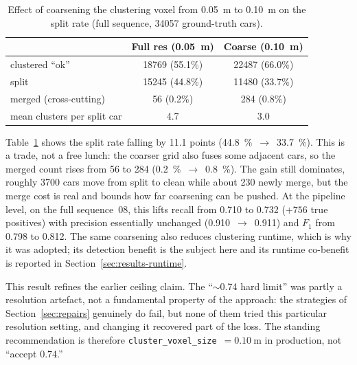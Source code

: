 \documentclass[a4paper,12pt]{report}
\begin{document}
\begin{table}[H]
  \centering
  \caption[Effect of coarsening the clustering voxel]{Effect of coarsening the clustering
    voxel from \SI{0.05}{\metre} to \SI{0.10}{\metre} on the split rate (full sequence,
    \num{34057} ground-truth cars).}
  \label{tab:splitrate}
  \begin{tabular}{lcc}
    \toprule
    & Full res (\SI{0.05}{\metre}) & Coarse (\SI{0.10}{\metre}) \\
    \midrule
    clustered ``ok''            & 18769 (55.1\%) & 22487 (66.0\%) \\
    split                        & 15245 (44.8\%) & 11480 (33.7\%) \\
    merged (cross-cutting)       & 56 (0.2\%)     & 284 (0.8\%)    \\
    mean clusters per split car  & 4.7            & 3.0 \\
    \bottomrule
  \end{tabular}
\end{table}

Table~\ref{tab:splitrate} shows the split rate falling by \num{11.1} points
(\SI{44.8}{\percent}~$\rightarrow$~\SI{33.7}{\percent}). This is a trade, not a
free lunch: the coarser grid also fuses some adjacent cars, so the merged count
rises from \num{56} to \num{284} (\SI{0.2}{\percent}~$\rightarrow$~\SI{0.8}{\percent}).
The gain still dominates, roughly \num{3700} cars move from split to clean while
about \num{230} newly merge, but the merge cost is real and bounds how far
coarsening can be pushed.
At the pipeline level, on the full sequence~08, this lifts recall from \num{0.710} to
\num{0.732} ($+\num{756}$ true positives) with precision essentially unchanged
(\num{0.910}~$\rightarrow$~\num{0.911}) and $F_1$ from \num{0.798} to \num{0.812}. The same coarsening also reduces clustering runtime, which is why it
was adopted; its detection benefit is the subject here and its runtime co-benefit is
reported in Section~\ref{sec:results-runtime}.

This result refines the earlier ceiling claim. The ``$\sim$\num{0.74}
hard limit'' was partly a resolution artefact, not a fundamental property of
the approach: the strategies of Section~\ref{sec:repairs} genuinely do fail, but none
of them tried this particular resolution setting, and changing it recovered part of
the loss. The standing recommendation is therefore
\texttt{cluster\_voxel\_size}~$=\SI{0.10}{\metre}$ in production, not ``accept
\num{0.74}.''
\end{document}
